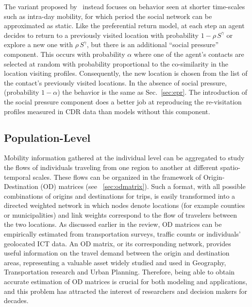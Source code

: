 The variant proposed by~\cite{toole_2015_coupling} instead focuses on behavior seen at shorter time-scales such as intra-day mobility, for which period the social network can be approximated as static. Like the preferential return model, at each step an agent decides to return to a previously visited location with probability $1-\rho\, S^\gamma$ or explore a new one with $\rho\, S^\gamma$, but there is an additional ``social pressure'' component. This occurs with probability $\alpha$ where one of the agent's contacts are selected at random with probability proportional to the co-similarity in the location visiting profiles. Consequently, the new location is chosen from the list of the contact's previously visited locations. In the absence of social pressure, (probability $1-\alpha$) the behavior is the same as Sec.~\ref{sec:epr}. The introduction of the social pressure component does a better job at reproducing the re-visitation profiles measured in CDR data than models without this component.  

\subsection{Population-Level}
\label{sec:poplev}

Mobility information gathered at the individual level can be aggregated to study the flows of individuals traveling from one region to another at different spatio-temporal scales. These flows can be organized in the framework of Origin-Destination (OD) matrices (see \sectionname~\ref{sec:odmatrix}). Such a format, with all possible combinations of origins and destinations for trips, is easily transformed into a directed weighted network in which nodes denote locations (for example counties or municipalities) and link weights correspond to the flow of travelers between the two locations. As discussed earlier in the review, OD matrices can be empirically estimated from transportation surveys, traffic counts or individuals' geolocated ICT data. An OD matrix, or its corresponding network, provides useful information on the travel demand between the origin and destination areas, representing a valuable asset widely studied and used in Geography, Transportation research and Urban Planning. Therefore, being able to obtain accurate estimation of OD matrices is crucial for both modeling and applications, and this problem has attracted the interest of researchers and decision makers for decades.


